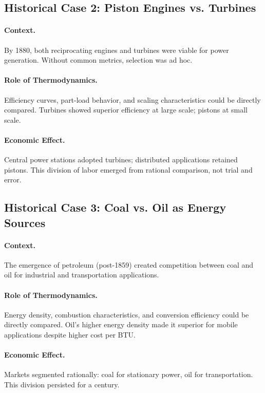 \subsection{Historical Case 2: Piston Engines vs. Turbines}

\paragraph{Context.} By 1880, both reciprocating engines and turbines were
viable for power generation. Without common metrics, selection was ad hoc.

\paragraph{Role of Thermodynamics.} Efficiency curves, part-load behavior,
and scaling characteristics could be directly compared. Turbines showed
superior efficiency at large scale; pistons at small scale.

\paragraph{Economic Effect.} Central power stations adopted turbines; distributed
applications retained pistons. This division of labor emerged from rational
comparison, not trial and error.

\subsection{Historical Case 3: Coal vs. Oil as Energy Sources}

\paragraph{Context.} The emergence of petroleum (post-1859) created competition
between coal and oil for industrial and transportation applications.

\paragraph{Role of Thermodynamics.} Energy density, combustion characteristics,
and conversion efficiency could be directly compared. Oil's higher energy
density made it superior for mobile applications despite higher cost per BTU.

\paragraph{Economic Effect.} Markets segmented rationally: coal for stationary
power, oil for transportation. This division persisted for a century.

